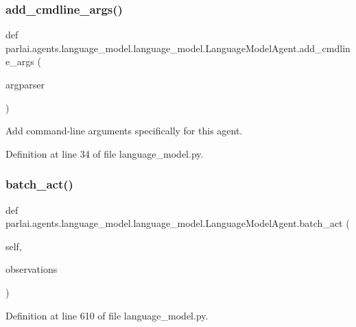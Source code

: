 \subsubsection{\texorpdfstring{add\+\_\+cmdline\+\_\+args()}{add\_cmdline\_args()}}
{\footnotesize\ttfamily def parlai.\+agents.\+language\+\_\+model.\+language\+\_\+model.\+Language\+Model\+Agent.\+add\+\_\+cmdline\+\_\+args (\begin{DoxyParamCaption}\item[{}]{argparser }\end{DoxyParamCaption})\hspace{0.3cm}{\ttfamily [static]}}

\begin{DoxyVerb}Add command-line arguments specifically for this agent.\end{DoxyVerb}
 

Definition at line 34 of file language\+\_\+model.\+py.

\mbox{\label{classparlai_1_1agents_1_1language__model_1_1language__model_1_1LanguageModelAgent_a91a1386cee7fa786aa817a58646cda5e}} 
\subsubsection{\texorpdfstring{batch\+\_\+act()}{batch\_act()}}
{\footnotesize\ttfamily def parlai.\+agents.\+language\+\_\+model.\+language\+\_\+model.\+Language\+Model\+Agent.\+batch\+\_\+act (\begin{DoxyParamCaption}\item[{}]{self,  }\item[{}]{observations }\end{DoxyParamCaption})}



Definition at line 610 of file language\+\_\+model.\+py.



